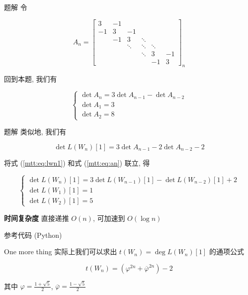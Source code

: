 \begin{frame}[fragile]{题解}
	令

	\[
		A_n = \begin{bmatrix}
			3  & -1 &        &        &        &    \\
			-1 & 3  & -1     &        &        &    \\
			   & -1 & 3      & \ddots &        &    \\
			   &    & \ddots & \ddots & \ddots &    \\
			   &    &        & \ddots & 3      & -1 \\
			   &    &        &        & -1     & 3
		\end{bmatrix}_{n}
	\]

	回到本题, 我们有

	\begin{equation}
		\label{mtt:eq:an}
		\begin{cases}
			\det A_n = 3\det A_{n-1}-\det A_{n-2} \\
			\det A_1 = 3                          \\
			\det A_2 = 8
		\end{cases}
	\end{equation}
\end{frame}


\begin{frame}[fragile]{题解}
	类似地, 我们有

	\begin{equation}
		\label{mtt:eq:lwn1}
		\det L(W_n)[1] = 3\det A_{n-1}-2\det A_{n-2}-2
	\end{equation}

	将式 (\ref{mtt:eq:lwn1}) 和式 (\ref{mtt:eq:an}) 联立, 得

	\begin{equation}
		\label{mtt:eq:lwn2}
		\begin{cases}
			\det L(W_n)[1] = 3\det L(W_{n-1})[1]-\det L(W_{n-2})[1]+2 \\
			\det L(W_1)[1] = 1                                        \\
			\det L(W_2)[1] = 5
		\end{cases}
	\end{equation}

	\textbf{时间复杂度}\xspace 直接递推 \(O(n)\), 可加速到 \(O(\log n)\)
\end{frame}


\begin{frame}[fragile]{参考代码 (Python)}
\end{frame}


\begin{frame}[fragile]{One more thing}
	实际上我们可以求出 \(t(W_n)=\deg L(W_n)[1]\) 的通项公式

	\[
		t(W_n)=(\varphi^{2n}+\overline{\varphi}^{2n})-2
	\]

	其中 \(\varphi=\frac{1+\sqrt{5}}{2}\), \(\overline{\varphi}=\frac{1-\sqrt{5}}{2}\)
\end{frame}
